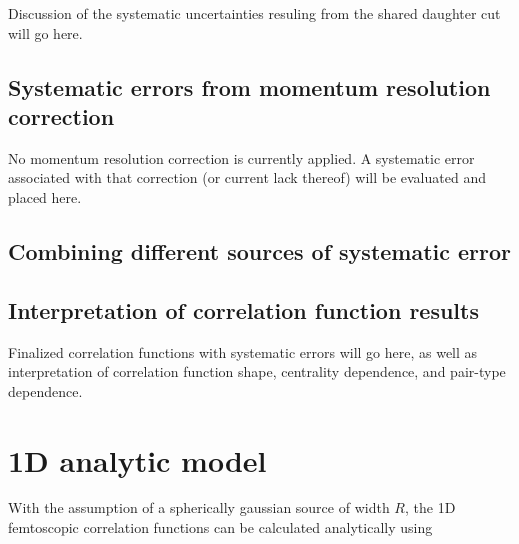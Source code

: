 Discussion of the systematic uncertainties resuling from the shared daughter cut will go here.

\subsection{Systematic errors from momentum resolution correction}

No momentum resolution correction is currently applied.  A systematic error associated with that correction (or current lack thereof) will be evaluated and placed here.

\subsection{Combining different sources of systematic error}
\label{sec:CombiningSys}

\subsection{Interpretation of correlation function results}
\label{sec:CFInterpretation}

Finalized correlation functions with systematic errors will go here, as well as interpretation of correlation function shape, centrality dependence, and pair-type dependence.  

\section{1D analytic model}
\label{sec:AnalyticModel}
With the assumption of a spherically gaussian source of width $R$, the 1D femtoscopic correlation functions can be calculated analytically \cite{lednicky82} using 

